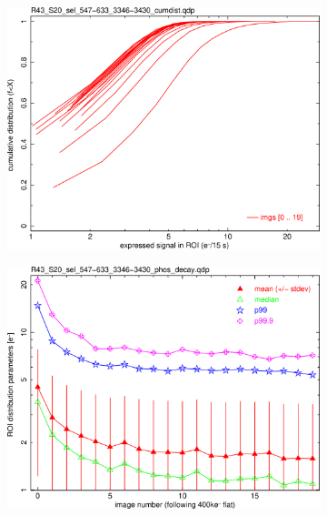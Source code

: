 \begin{figure}[!htbp]
\begin{subfigure}{0.45\textwidth}
  \centering
  \includegraphics[width=\textwidth]{figures/phosphorescence-survey/phos_kinetics/R43_S20_sel_547-633_3346-3430_cumdist.png}    
\end{subfigure}
\hfil
\begin{subfigure}{0.45\textwidth}
  \centering
  \includegraphics[width=\textwidth]{figures/phosphorescence-survey/phos_kinetics/R43_S20_sel_547-633_3346-3430_phos_decay.png}
\end{subfigure}
\newline
\begin{subfigure}{0.45\textwidth}    
  \centering

\end{subfigure}
\end{figure}
